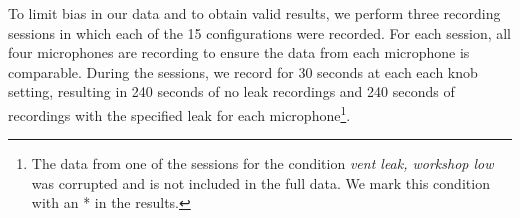 To limit bias in our data and to obtain valid results, we perform three recording sessions in which each of the 15 configurations were recorded. For each session, all four microphones are recording to ensure the data from each microphone is comparable. During the sessions, we record for 30 seconds at each each knob setting, resulting in 240 seconds of no leak recordings and 240 seconds of recordings with the specified leak for each microphone\footnote{The data from one of the sessions for the condition \textit{vent leak, workshop low} was corrupted and is not included in the full data. We mark this condition with an * in the results.}.

